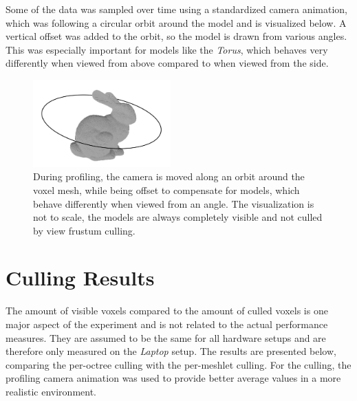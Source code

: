 \noindent
Some of the data was sampled over time using a standardized camera animation, which was following a circular orbit 
around the model and is visualized below. A vertical offset was added to the orbit, so the model is drawn from various 
angles. This was especially important for models like the \emph{Torus}, which behaves very differently when viewed 
from above compared to when viewed from the side.

\begin{figure}[h]
    \centering
    \includegraphics[width=200px]{images/graphics/test-anim-camera-path.jpg}
    \caption{During profiling, the camera is moved along an orbit around the voxel mesh, while being offset to compensate 
    for models, which behave differently when viewed from an angle. The visualization is not to scale, the models 
    are always completely visible and not culled by view frustum culling.}
    \label{fig:test-anim-camera-path}
\end{figure}



%
%
%
%
%
%


\section{Culling Results}

The amount of visible voxels compared to the amount of culled voxels is one major aspect of the 
experiment and is not related to the actual performance measures. They are assumed to be the same 
for all hardware setups and are therefore only measured on the \emph{Laptop} setup. The results are 
presented below, comparing the per-octree culling with the per-meshlet culling. For the culling, the 
profiling camera animation was used to provide better average values in a more realistic environment.\\


